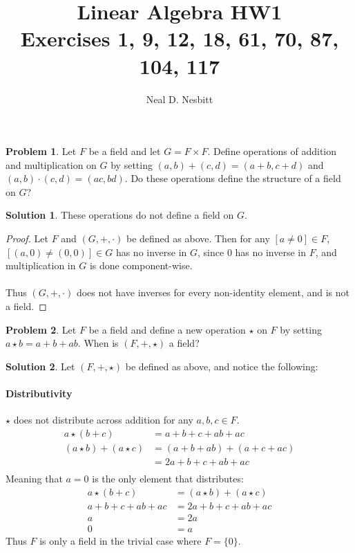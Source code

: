 \documentclass{article}
\title{Linear Algebra HW1\\
Exercises 1, 9, 12, 18, 61, 70, 87, 104, 117}
\author{Neal D. Nesbitt}
\begin{document}
\maketitle

\theoremstyle{definition}
\newtheorem{problem}{Problem}
\newtheorem{solution}{Solution}[problem]
\renewcommand{\thesolution}{\theproblem}

\begin{problem}
Let $F$ be a field and let $G = F \times F$. Define operations of addition and multiplication on $G$ by setting $(a,b) + (c,d) = (a+b,c+d)$ and $(a,b)\cdot (c,d) = (ac,bd)$. Do these operations define the structure of a field on $G$?
\end{problem}

\begin{solution}
These operations do not define a field on $G$.
\begin{proof}
Let $F$ and $(G,+,\cdot)$ be defined as above. Then for any $[a \ne 0] \in F$, $\left[(a,0) \ne (0,0)\right] \in G$ has no inverse in $G$, since $0$ has no inverse in $F$, and multiplication in $G$ is done component-wise.\\
\\
Thus $(G,+,\cdot)$ does not have inverses for every non-identity element, and is not a field.
\end{proof}
\end{solution}

\setcounter{problem}{8}
\begin{problem}
Let $F$ be a field and define a new operation $\star$ on $F$ by setting $a \star b = a + b + ab$. When is $(F, +, \star)$ a field?
\end{problem}

\begin{solution}
Let $(F, +, \star)$ be defined as above, and notice the following:

\paragraph{Distributivity}
$\star$ does not distribute across addition for any $a,b,c \in F$.
\begin{align*}
a \star (b+c) &= \boxed{a + b + c + ab + ac} \\
(a \star b) + (a \star c) &= (a + b + ab) + (a + c + ac) \\
&= \boxed{2a + b + c + ab + ac}\\
\end{align*}
Meaning that $a=0$ is the only element that distributes:
\begin{align*}
a \star (b+c) &= (a \star b) + (a \star c) \\
a + b + c + ab + ac &= 2a + b + c + ab + ac \\
a &= 2a \\
0 &= a
\end{align*}
Thus $F$ is only a field in the trivial case where $F=\{0\}$.
\end{solution}
\end{document}
